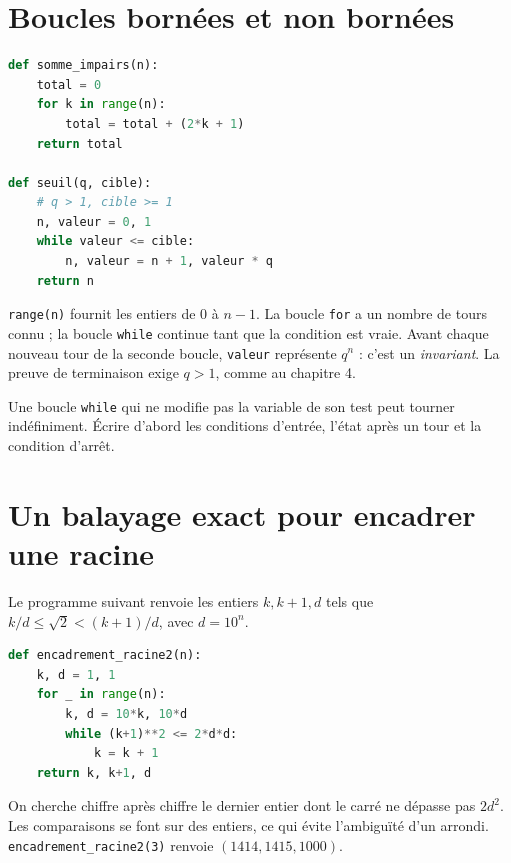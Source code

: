 \documentclass[../cours_2de.tex]{subfiles}
\begin{document}
\section{Boucles bornées et non bornées}
\begin{lstlisting}[language=Python]
def somme_impairs(n):
    total = 0
    for k in range(n):
        total = total + (2*k + 1)
    return total

def seuil(q, cible):
    # q > 1, cible >= 1
    n, valeur = 0, 1
    while valeur <= cible:
        n, valeur = n + 1, valeur * q
    return n
\end{lstlisting}
\texttt{range(n)} fournit les entiers de $0$ à $n-1$.
La boucle \texttt{for} a un nombre de tours connu ; la boucle \texttt{while} continue tant que la condition est vraie.
Avant chaque nouveau tour de la seconde boucle, \texttt{valeur} représente $q^n$ : c'est un \emph{invariant}. La preuve de terminaison exige $q>1$, comme au chapitre 4.
\begin{attention}
Une boucle \texttt{while} qui ne modifie pas la variable de son test peut tourner indéfiniment. Écrire d'abord les conditions d'entrée, l'état après un tour et la condition d'arrêt.
\end{attention}
\section{Un balayage exact pour encadrer une racine}
Le programme suivant renvoie les entiers $k,k+1,d$ tels que
$k/d\leq\sqrt2<(k+1)/d$, avec $d=10^n$.
\begin{lstlisting}[language=Python]
def encadrement_racine2(n):
    k, d = 1, 1
    for _ in range(n):
        k, d = 10*k, 10*d
        while (k+1)**2 <= 2*d*d:
            k = k + 1
    return k, k+1, d
\end{lstlisting}
On cherche chiffre après chiffre le dernier entier dont le carré ne dépasse pas $2d^2$.
Les comparaisons se font sur des entiers, ce qui évite l'ambiguïté d'un arrondi.
\texttt{encadrement\_racine2(3)} renvoie $(1414,1415,1000)$.
\end{document}
